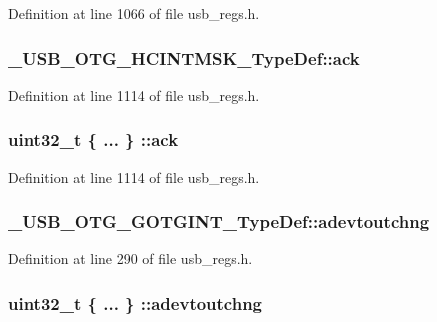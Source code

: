 Definition at line 1066 of file usb\-\_\-regs.\-h.

\hypertarget{group___u_s_b___o_t_g___d_r_i_v_e_r_ga0159abb7609563116d0b50b871d0ddfa}{
\subsubsection[{ack}]{ \-\_\-\-U\-S\-B\-\_\-\-O\-T\-G\-\_\-\-H\-C\-I\-N\-T\-M\-S\-K\-\_\-\-Type\-Def\-::ack}}\label{group___u_s_b___o_t_g___d_r_i_v_e_r_ga0159abb7609563116d0b50b871d0ddfa}


Definition at line 1114 of file usb\-\_\-regs.\-h.

\hypertarget{group___u_s_b___o_t_g___d_r_i_v_e_r_gaf6a19fd452e0acd8c27e1b2bc5e2dcdb}{
\subsubsection[{ack}]{\setlength{\rightskip}{0pt plus 5cm}uint32\-\_\-t \{ ... \} \-::ack}}\label{group___u_s_b___o_t_g___d_r_i_v_e_r_gaf6a19fd452e0acd8c27e1b2bc5e2dcdb}


Definition at line 1114 of file usb\-\_\-regs.\-h.

\hypertarget{group___u_s_b___o_t_g___d_r_i_v_e_r_ga39bad2c1d3b0fda34c485f0f40e06619}{
\subsubsection[{adevtoutchng}]{ \-\_\-\-U\-S\-B\-\_\-\-O\-T\-G\-\_\-\-G\-O\-T\-G\-I\-N\-T\-\_\-\-Type\-Def\-::adevtoutchng}}\label{group___u_s_b___o_t_g___d_r_i_v_e_r_ga39bad2c1d3b0fda34c485f0f40e06619}


Definition at line 290 of file usb\-\_\-regs.\-h.

\hypertarget{group___u_s_b___o_t_g___d_r_i_v_e_r_ga43f31921a00f0bc29f8b85e036c57902}{
\subsubsection[{adevtoutchng}]{\setlength{\rightskip}{0pt plus 5cm}uint32\-\_\-t \{ ... \} \-::adevtoutchng}}\label{group___u_s_b___o_t_g___d_r_i_v_e_r_ga43f31921a00f0bc29f8b85e036c57902}



